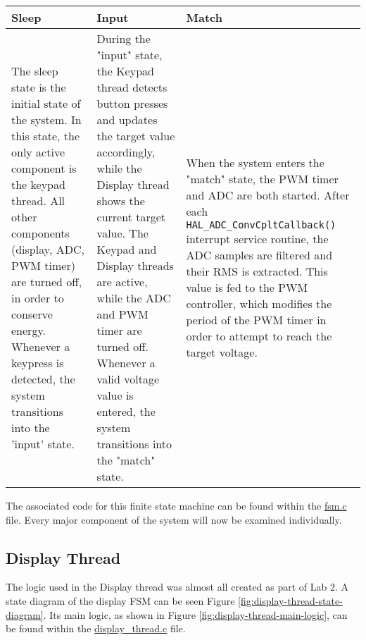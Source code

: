\begin{tabular}{ p{} | p{} | p{}}
Sleep & Input & Match \\
\hline
The sleep state is the initial state of the system. In this state, the only active component is the keypad thread. All other components (display, ADC, PWM timer) are turned off, in order to conserve energy. Whenever a keypress is detected, the system transitions into the 'input' state.
&
During the "input" state, the Keypad thread detects button presses and updates the target value accordingly, while the Display thread shows the current target value. The Keypad and Display threads are active, while the ADC and PWM timer are turned off. Whenever a valid voltage value is entered, the system transitions into the "match" state.
&
When the system enters the "match" state, the PWM timer and ADC are both started. After each \verb|HAL_ADC_ConvCpltCallback()| interrupt service routine, the ADC samples are filtered and their RMS is extracted. This value is fed to the PWM controller, which modifies the period of the PWM timer in order to attempt to reach the target voltage.
\\
\end{tabular}


The associated code for this finite state machine can be found within the \href{https://github.com/lebrice/MicroP/blob/master/Lab4/Src/fsm.c}{fsm.c} file. Every major component of the system will now be examined individually.


\subsection{Display Thread}

\def \DISPLAYREFRESHINTERVAL {8ms}

The logic used in the Display thread was almost all created as part of Lab 2. A state diagram of the display FSM can be seen Figure \ref{fig:display-thread-state-diagram}. Its main logic, as shown in Figure \ref{fig:display-thread-main-logic}, can be found within the \href{https://github.com/lebrice/MicroP/blob/master/Lab4/Src/display_thread.c}{display\_thread.c} file. \\ 


